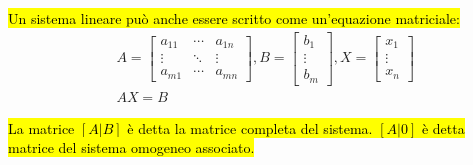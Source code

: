 \documentclass[a4paper,12pt,oneside]{article}
\begin{document}
\hl{Un sistema lineare può anche essere scritto come un'equazione matriciale:}
\begin{align*}
    & A =
    \begin{bmatrix}
        a_{11} & \cdots & a_{1n} \\
        \vdots & \ddots & \vdots \\
        a_{m1} & \cdots & a_{mn}
    \end{bmatrix}, B =
    \begin{bmatrix}
        b_1 \\ \vdots \\ b_m
    \end{bmatrix}, X =
    \begin{bmatrix}
        x_1 \\ \vdots \\ x_n
    \end{bmatrix} \\
    & AX = B
\end{align*}

\hl{La matrice $[A|B]$ è detta la matrice completa del sistema. $[A|0]$ è detta
matrice del sistema omogeneo associato.}
\end{document}
